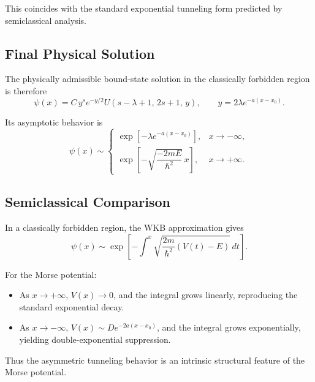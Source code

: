 This coincides with the standard exponential tunneling form
predicted by semiclassical analysis.

\subsection{Final Physical Solution}

The physically admissible bound-state solution in the classically
forbidden region is therefore
\begin{equation}
\boxed{
\psi(x)
=
C\, y^{s} e^{-y/2}
U(s-\lambda+1,\,2s+1,\,y),
\qquad
y=2\lambda e^{-a(x-x_0)}.
}
\label{physical}
\end{equation}

Its asymptotic behavior is
\[
\psi(x)\sim
\begin{cases}
\exp\!\left[-\lambda e^{-a(x-x_0)}\right],
& x\to -\infty, \\[6pt]
\exp\!\left[-\sqrt{\dfrac{-2mE}{\hbar^2}}\,x\right],
& x\to +\infty .
\end{cases}
\]

\subsection{Semiclassical Comparison}

In a classically forbidden region, the WKB approximation gives
\[
\psi(x)\sim
\exp\!\left[
-\int^x
\sqrt{\frac{2m}{\hbar^2}\left(V(t)-E\right)}
\,dt
\right].
\]

For the Morse potential:

\begin{itemize}
\item As $x\to +\infty$, $V(x)\to 0$, and the integral grows linearly,
      reproducing the standard exponential decay.
\item As $x\to -\infty$, $V(x)\sim D e^{-2a(x-x_0)}$,
      and the integral grows exponentially,
      yielding double-exponential suppression.
\end{itemize}

Thus the asymmetric tunneling behavior is an intrinsic structural
feature of the Morse potential.
